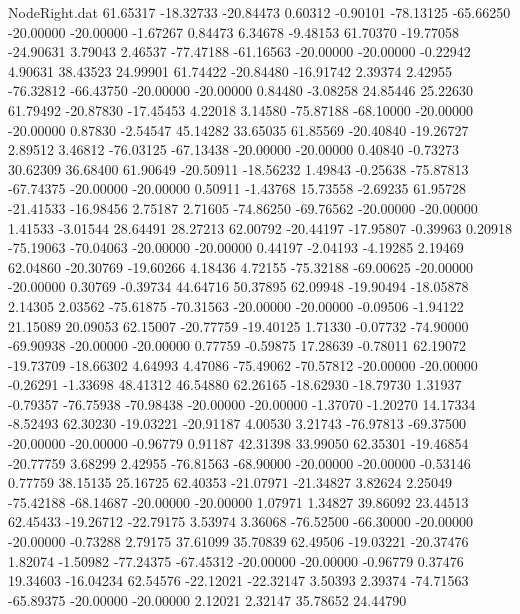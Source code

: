 \begin{filecontents}{NodeRight.dat}
  61.65317  -18.32733  -20.84473     0.60312   -0.90101  -78.13125  -65.66250  -20.00000  -20.00000   -1.67267    0.84473    6.34678   -9.48153
  61.70370  -19.77058  -24.90631     3.79043    2.46537  -77.47188  -61.16563  -20.00000  -20.00000   -0.22942    4.90631   38.43523   24.99901
  61.74422  -20.84480  -16.91742     2.39374    2.42955  -76.32812  -66.43750  -20.00000  -20.00000    0.84480   -3.08258   24.85446   25.22630
  61.79492  -20.87830  -17.45453     4.22018    3.14580  -75.87188  -68.10000  -20.00000  -20.00000    0.87830   -2.54547   45.14282   33.65035
  61.85569  -20.40840  -19.26727     2.89512    3.46812  -76.03125  -67.13438  -20.00000  -20.00000    0.40840   -0.73273   30.62309   36.68400
  61.90649  -20.50911  -18.56232     1.49843   -0.25638  -75.87813  -67.74375  -20.00000  -20.00000    0.50911   -1.43768   15.73558   -2.69235
  61.95728  -21.41533  -16.98456     2.75187    2.71605  -74.86250  -69.76562  -20.00000  -20.00000    1.41533   -3.01544   28.64491   28.27213
  62.00792  -20.44197  -17.95807    -0.39963    0.20918  -75.19063  -70.04063  -20.00000  -20.00000    0.44197   -2.04193   -4.19285    2.19469
  62.04860  -20.30769  -19.60266     4.18436    4.72155  -75.32188  -69.00625  -20.00000  -20.00000    0.30769   -0.39734   44.64716   50.37895
  62.09948  -19.90494  -18.05878     2.14305    2.03562  -75.61875  -70.31563  -20.00000  -20.00000   -0.09506   -1.94122   21.15089   20.09053
  62.15007  -20.77759  -19.40125     1.71330   -0.07732  -74.90000  -69.90938  -20.00000  -20.00000    0.77759   -0.59875   17.28639   -0.78011
  62.19072  -19.73709  -18.66302     4.64993    4.47086  -75.49062  -70.57812  -20.00000  -20.00000   -0.26291   -1.33698   48.41312   46.54880
  62.26165  -18.62930  -18.79730     1.31937   -0.79357  -76.75938  -70.98438  -20.00000  -20.00000   -1.37070   -1.20270   14.17334   -8.52493
  62.30230  -19.03221  -20.91187     4.00530    3.21743  -76.97813  -69.37500  -20.00000  -20.00000   -0.96779    0.91187   42.31398   33.99050
  62.35301  -19.46854  -20.77759     3.68299    2.42955  -76.81563  -68.90000  -20.00000  -20.00000   -0.53146    0.77759   38.15135   25.16725
  62.40353  -21.07971  -21.34827     3.82624    2.25049  -75.42188  -68.14687  -20.00000  -20.00000    1.07971    1.34827   39.86092   23.44513
  62.45433  -19.26712  -22.79175     3.53974    3.36068  -76.52500  -66.30000  -20.00000  -20.00000   -0.73288    2.79175   37.61099   35.70839
  62.49506  -19.03221  -20.37476     1.82074   -1.50982  -77.24375  -67.45312  -20.00000  -20.00000   -0.96779    0.37476   19.34603  -16.04234
  62.54576  -22.12021  -22.32147     3.50393    2.39374  -74.71563  -65.89375  -20.00000  -20.00000    2.12021    2.32147   35.78652   24.44790

\end{filecontents}
